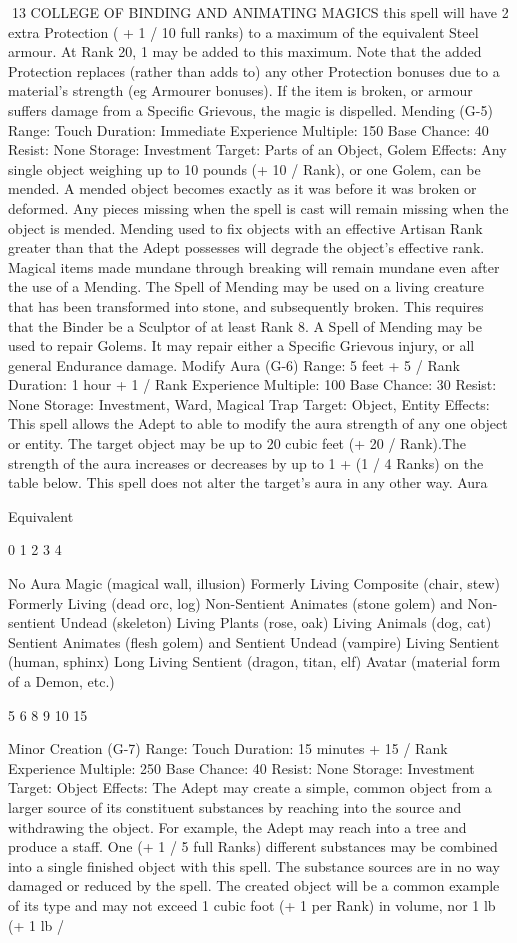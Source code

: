 \documentclass[a4paper]{article}
\begin{document}
\begin{multicols}{3}
13 COLLEGE OF BINDING AND ANIMATING MAGICS
this spell will have 2 extra Protection ( + 1 / 10 full
ranks) to a maximum of the equivalent Steel armour. At Rank 20, 1 may be added to this maximum.
Note that the added Protection replaces (rather than
adds to) any other Protection bonuses due to a
material’s strength (eg Armourer bonuses). If the
item is broken, or armour suffers damage from a
Specific Grievous, the magic is dispelled.
Mending (G-5)
Range: Touch
Duration: Immediate
Experience Multiple: 150
Base Chance: 40%
Resist: None
Storage: Investment
Target: Parts of an Object, Golem
Effects: Any single object weighing up to 10
pounds (+ 10 / Rank), or one Golem, can be
mended. A mended object becomes exactly as it
was before it was broken or deformed. Any pieces
missing when the spell is cast will remain missing
when the object is mended. Mending used to fix
objects with an effective Artisan Rank greater than
that the Adept possesses will degrade the object’s
effective rank. Magical items made mundane
through breaking will remain mundane even after
the use of a Mending. The Spell of Mending may
be used on a living creature that has been transformed into stone, and subsequently broken. This
requires that the Binder be a Sculptor of at least
Rank 8. A Spell of Mending may be used to repair
Golems. It may repair either a Specific Grievous
injury, or all general Endurance damage.
Modify Aura (G-6)
Range: 5 feet + 5 / Rank
Duration: 1 hour + 1 / Rank
Experience Multiple: 100
Base Chance: 30%
Resist: None
Storage: Investment, Ward, Magical Trap
Target: Object, Entity
Effects: This spell allows the Adept to able to
modify the aura strength of any one object or entity. The target object may be up to 20 cubic feet (+
20 / Rank).The strength of the aura increases or
decreases by up to 1 + (1 / 4 Ranks) on the table
below. This spell does not alter the target’s aura in
any other way.
Aura

Equivalent

0
1
2
3
4

No Aura
Magic (magical wall, illusion)
Formerly Living Composite (chair, stew)
Formerly Living (dead orc, log)
Non-Sentient Animates (stone golem) and
Non-sentient Undead (skeleton)
Living Plants (rose, oak)
Living Animals (dog, cat)
Sentient Animates (flesh golem) and
Sentient Undead (vampire)
Living Sentient (human, sphinx)
Long Living Sentient (dragon, titan, elf)
Avatar (material form of a Demon, etc.)

5
6
8
9
10
15

Minor Creation (G-7)
Range: Touch
Duration: 15 minutes + 15 / Rank
Experience Multiple: 250
Base Chance: 40%
Resist: None
Storage: Investment
Target: Object
Effects: The Adept may create a simple, common
object from a larger source of its constituent substances by reaching into the source and withdrawing the object. For example, the Adept may reach
into a tree and produce a staff. One (+ 1 / 5 full
Ranks) different substances may be combined into
a single finished object with this spell. The substance sources are in no way damaged or reduced
by the spell. The created object will be a common
example of its type and may not exceed 1 cubic
foot (+ 1 per Rank) in volume, nor 1 lb (+ 1 lb /


\end{multicols}
\end{document}
